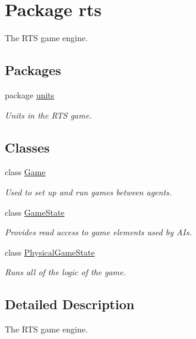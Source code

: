 \hypertarget{namespacerts}{
\section{Package rts}
\label{namespacerts}
}


The RTS game engine.  


\subsection*{Packages}
\begin{DoxyCompactItemize}
\item 
package \hyperlink{namespacerts_1_1units}{units}


\begin{DoxyCompactList}\small\item\em Units in the RTS game. \end{DoxyCompactList}

\end{DoxyCompactItemize}
\subsection*{Classes}
\begin{DoxyCompactItemize}
\item 
class \hyperlink{classrts_1_1_game}{Game}
\begin{DoxyCompactList}\small\item\em Used to set up and run games between agents. \end{DoxyCompactList}\item 
class \hyperlink{classrts_1_1_game_state}{GameState}
\begin{DoxyCompactList}\small\item\em Provides read access to game elements used by AIs. \end{DoxyCompactList}\item 
class \hyperlink{classrts_1_1_physical_game_state}{PhysicalGameState}
\begin{DoxyCompactList}\small\item\em Runs all of the logic of the game. \end{DoxyCompactList}\end{DoxyCompactItemize}


\subsection{Detailed Description}
The RTS game engine. 